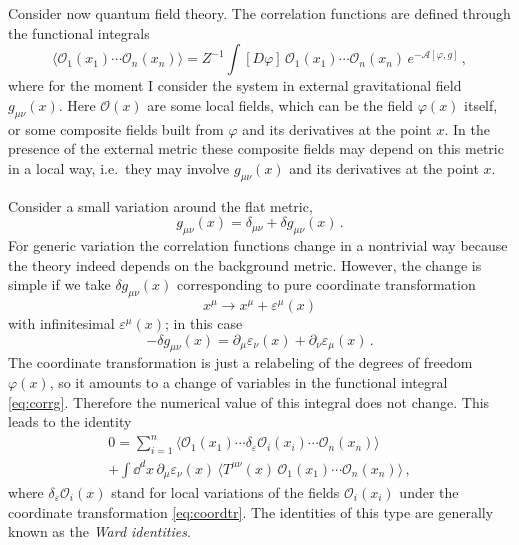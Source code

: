 Consider now quantum field theory. The correlation functions are defined through
the functional integrals
\begin{equation}\label{eq:corrg}
\bigl\langle\mathcal O_1(x_1)\cdots\mathcal O_n(x_n)\bigr\rangle=Z^{-1}\int[D\varphi]\,\mathcal O_1(x_1)\cdots\mathcal O_n(x_n)\,e^{-\mathcal A[\varphi,g]}\,,
\end{equation}
where for the moment I consider the system in external gravitational field
$g_{\mu\nu}(x)$. Here $\mathcal O(x)$ are some local fields, which can be the field
$\varphi(x)$ itself, or some composite fields built from $\varphi$ and its
derivatives at the point $x$. In the presence of the external metric these
composite fields may depend on this metric in a local way, i.e.\ they may involve
$g_{\mu\nu}(x)$ and its derivatives at the point $x$.

Consider a small variation around the flat metric,
\[
g_{\mu\nu}(x)=\delta_{\mu\nu}+\delta g_{\mu\nu}(x)\,.
\]
For generic variation the correlation functions change in a nontrivial way because
the theory indeed depends on the background metric. However, the change is simple
if we take $\delta g_{\mu\nu}(x)$ corresponding to pure coordinate transformation
\begin{equation}\label{eq:coordtr}
x^\mu\to x^\mu+\varepsilon^\mu(x)
\end{equation}
with infinitesimal $\varepsilon^\mu(x)$; in this case
\[
-\delta g_{\mu\nu}(x)=\partial_\mu\varepsilon_\nu(x)+\partial_\nu\varepsilon_\mu(x)\,.
\]
The coordinate transformation is just a relabeling of the degrees of freedom
$\varphi(x)$, so it amounts to a change of variables in the functional integral
\eqref{eq:corrg}. Therefore the numerical value of this integral does not change.
This leads to the identity
\begin{multline}\label{eq:Ward}
0=\sum_{i=1}^n\bigl\langle\mathcal O_1(x_1)\cdots\delta_\varepsilon\mathcal O_i(x_i)\cdots\mathcal O_n(x_n)\bigr\rangle\\
+\int \dd^dx\,\partial_\mu\varepsilon_\nu(x)\,\bigl\langle T^{\mu\nu}(x)\,\mathcal O_1(x_1)\cdots\mathcal O_n(x_n)\bigr\rangle\,,
\end{multline}
where $\delta_\varepsilon\mathcal O_i(x)$ stand for local variations of the fields
$\mathcal O_i(x_i)$ under the coordinate transformation \eqref{eq:coordtr}. The
identities of this type are generally known as the \emph{Ward identities}.

